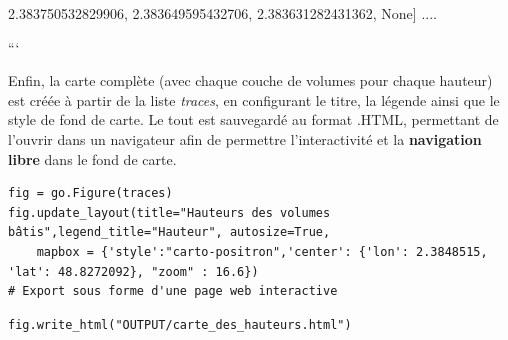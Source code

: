 \documentclass[
  11pt,
  french,
]{article}
\begin{document}
\begin{tcolorbox}[title= Répartition des volumes selon leurs caractéristiques ,colback=boitecode]
2.383750532829906, 2.383649595432706, 2.383631282431362, None]
....

```

\end{tcolorbox}

Enfin, la carte complète (avec chaque couche de volumes pour chaque
hauteur) est créée à partir de la liste \emph{traces}, en configurant le
titre, la légende ainsi que le style de fond de carte. Le tout est
sauvegardé au format .HTML, permettant de l'ouvrir dans un navigateur
afin de permettre l'interactivité et la \textbf{navigation libre} dans
le fond de carte.

\begin{tcolorbox}[title= Répartition des volumes selon leurs caractéristiques ,colback=boitecode]
\begin{lstlisting}[style=code]
fig = go.Figure(traces)
fig.update_layout(title="Hauteurs des volumes bâtis",legend_title="Hauteur", autosize=True,
    mapbox = {'style':"carto-positron",'center': {'lon': 2.3848515, 'lat': 48.8272092}, "zoom" : 16.6})
# Export sous forme d'une page web interactive\end{lstlisting}
\begin{lstlisting}[style=code]
fig.write_html("OUTPUT/carte_des_hauteurs.html")\end{lstlisting}
\end{tcolorbox}
\end{document}
